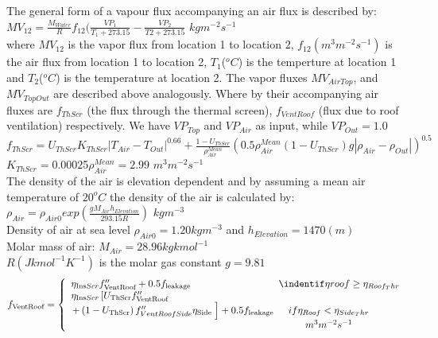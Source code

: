 \indent The general form of a vapour flux accompanying an air flux is described by:
\newline
$MV_{12}=\frac{M_{Water}}{R}f_{12}(\frac{VP_{1}}{T_{1}+273.15}-\frac{VP_{2}}{T2+273.15}$ \indent $kgm^{-2}s^{-1}$\\
\indent where $MV_{12}$ is the vapor flux from location 1 to location 2, $f_{12}(m^{3}m^{-2}s^{-1})$ is the air flux from location 1 to location 2, $T_{1}$($^{o}{C}$) is the temperture at location 1 and $T_{2}$($^{o}{C}$) is the temperature at location 2.
\indent The vapor fluxes $MV_{AirTop}$, and $MV_{TopOut}$ are described above analogously. Where by their accompanying air fluxes are $f_{ThScr}$ (the flux through the thermal screen), $f_{VentRoof}$ (flux due to roof ventilation) respectively. We have $VP_{Top}$ and $VP_{Air}$ as input, while $VP_{Out}=1.0$\\
$f_{ThScr}=U_{ThScr}K_{ThScr}|T_{Air}-T_{Out}|^{0.66}+\frac{1-U_{ThScr}}{\rho_{Air}^{Mean}}(0.5\rho_{Air}^{Mean}(1-U_{ThScr})g|\rho_{Air}-\rho_{Out}|)^{0.5}$\\
$K_{ThScr}=0.0002$5\indent $\rho_{Air}^{Mean}=2.99$ \indent \indent $m^{3}m^{-2}s^{-1}$\\
\indent The density of the air is elevation dependent and by assuming a mean air temperature of $20^{o}C$ the density of the air is calculated by:\\
$\rho_{Air}=\rho_{Air0}exp(\frac{gM_{Air}h_{Elevation}}{293.15R})$ \indent \indent $kgm^{-3}$\\
\indent Density of air at sea level $\rho_{Air0}=1.20kgm^{-3}$ and $h_{Elevation}=1470(m)$\\
\indent Molar mass of air: $M_{Air}=28.96 kgkmol^{-1}$\\
\indent $R (Jkmol^{-1}K^{-1})$ is the molar gas constant $g=9.81$
\begin{equation}
f_{\text {VentRoof}}=\left\{\begin{array}{l}
\eta_{\text {Ins}Scr} f_{\text {VentRoof}}^{\prime \prime}+0.5 f_{\text {leakage}}\indent \indent \indent \indent \indent \indent \indentif\eta{roof} \geq \eta_{Roof_Thr}\\
\eta_{\text {Ins}Scr}\left[U_{\text {ThScr}} f_{\text {VentRoof}}^{\prime \prime}\right. \\
\left.+\left(1-U_{\text {ThScr}}\right) f_{VentRoofSide}^{\prime \prime} \eta_{\text {Side }}\right]+0.5 f_{\text {leakage}}\indent if \eta_{Roof}<\eta_{Side_Thr} \\
\indent \indent \indent \indent \indent \indent\indent \indent \indent \indent \indent \indent\indent \indent \indent \indent m^{3}m^{-2}s^{-1}
\end{array}\right.
\end{equation}
